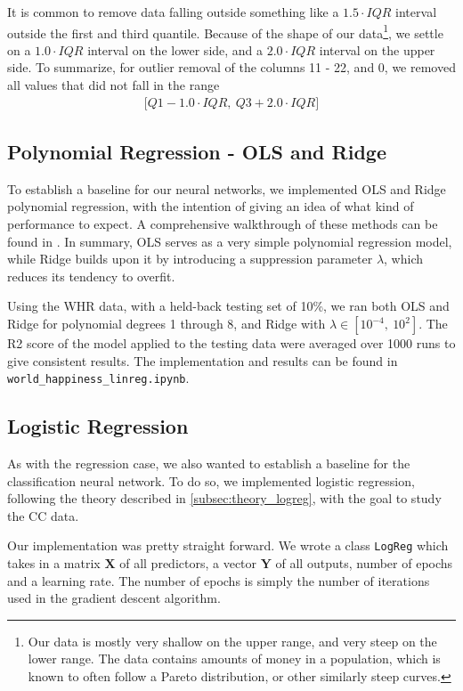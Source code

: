 \documentclass[10pt, twocolumn]{article}
\begin{document}
It is common to remove data falling outside something like a $1.5\cdot IQR$ interval outside the first and third quantile. Because of the shape of our data\footnote{Our data is mostly very shallow on the upper range, and very steep on the lower range. The data contains amounts of money in a population, which is known to often follow a Pareto distribution, or other similarly steep curves.}, we settle on a $1.0\cdot IQR$ interval on the lower side, and a $2.0\cdot IQR$ interval on the upper side. To summarize, for outlier removal of the columns 11 - 22, and 0, we removed all values that did not fall in the range
\begin{align*}
    \big[Q1 - 1.0\cdot IQR,\ Q3 + 2.0\cdot IQR\big]
\end{align*}


\subsection{Polynomial Regression - OLS and Ridge}
To establish a baseline for our neural networks, we implemented OLS and Ridge polynomial regression, with the intention of giving an idea of what kind of performance to expect. A comprehensive walkthrough of these methods can be found in \cite{Project1}. In summary, OLS serves as a very simple polynomial regression model, while Ridge builds upon it by introducing a suppression parameter $\lambda$, which reduces its tendency to overfit.

Using the WHR data, with a held-back testing set of 10\%, we ran both OLS and Ridge for polynomial degrees 1 through 8, and Ridge with $\lambda \in [10^{-4},\ 10^2]$. The R2 score of the model applied to the testing data were averaged over 1000 runs to give consistent results. The implementation and results can be found in \texttt{world\_happiness\_linreg.ipynb}.

\subsection{Logistic Regression}
As with the regression case, we also wanted to establish a baseline for the classification neural network. To do so, we implemented logistic regression, following the theory described in \cref{subsec:theory_logreg}, with the goal to study the CC data.

Our implementation was pretty straight forward. We wrote a class \texttt{LogReg} which takes in a matrix $\bm{X}$ of all predictors, a vector $\bm{Y}$ of all outputs, number of epochs and a learning rate. The number of epochs is simply the number of iterations used in the gradient descent algorithm. 
\end{document}
